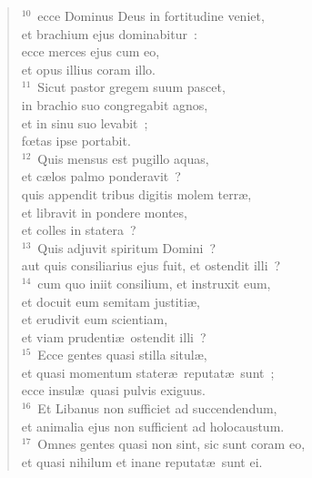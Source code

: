 \begin{verse}
${}^{10}$~ecce Dominus Deus in fortitudine veniet,\\ et brachium ejus dominabitur~:\\ ecce merces ejus cum eo,\\ et opus illius coram illo.\\
${}^{11}$~Sicut pastor gregem suum pascet,\\ in brachio suo congregabit agnos,\\ et in sinu suo levabit~;\\ fœtas ipse portabit.\\
${}^{12}$~Quis mensus est pugillo aquas,\\ et c\ae los palmo ponderavit~?\\ quis appendit tribus digitis molem terr\ae ,\\ et libravit in pondere montes,\\ et colles in statera~?\\
${}^{13}$~Quis adjuvit spiritum Domini~?\\ aut quis consiliarius ejus fuit, et ostendit illi~?\\
${}^{14}$~cum quo iniit consilium, et instruxit eum,\\ et docuit eum semitam justiti\ae ,\\ et erudivit eum scientiam,\\ et viam prudenti\ae\ ostendit illi~?\\
${}^{15}$~Ecce gentes quasi stilla situl\ae ,\\ et quasi momentum stater\ae\ reputat\ae\ sunt~;\\ ecce insul\ae\ quasi pulvis exiguus.\\
${}^{16}$~Et Libanus non sufficiet ad succendendum,\\ et animalia ejus non sufficient ad holocaustum.\\
${}^{17}$~Omnes gentes quasi non sint, sic sunt coram eo,\\ et quasi nihilum et inane reputat\ae\ sunt ei.\end{verse}


